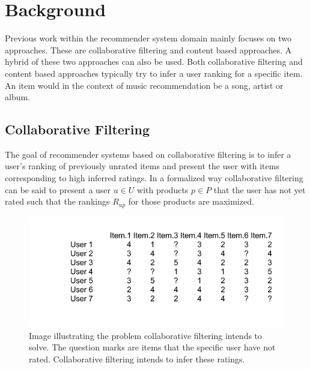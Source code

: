 \documentclass[a4paper,11pt]{kth-mag}
\begin{document}
\chapter{Background}

Previous work within the recommender system domain mainly focuses on two approaches. These are collaborative filtering and content based approaches. A hybrid of these two approaches can also be used. Both collaborative filtering and content based approaches typically try to infer a user ranking for a specific item\cite{melville2002content}. An item would in the context of music recommendation be a song, artist or album.

\section{Collaborative Filtering}
The goal of recommender systems based on collaborative filtering is to infer a user's ranking of previously unrated items and present the user with items corresponding to high inferred ratings. In a formalized way collaborative filtering can be said to present a user $u \in U$ with products $p \in P$ that the user has not yet rated such that the rankings $R_{up}$ for those products are maximized\cite{breese1998empirical}.

\begin{figure}
\includegraphics[scale=0.6]{images/colFiltMat.png}
\caption{Image illustrating the problem collaborative filtering intends to solve. The question marks are items that the specific user have not rated. Collaborative filtering intends to infer these ratings.}
\end{figure}
\end{document}
